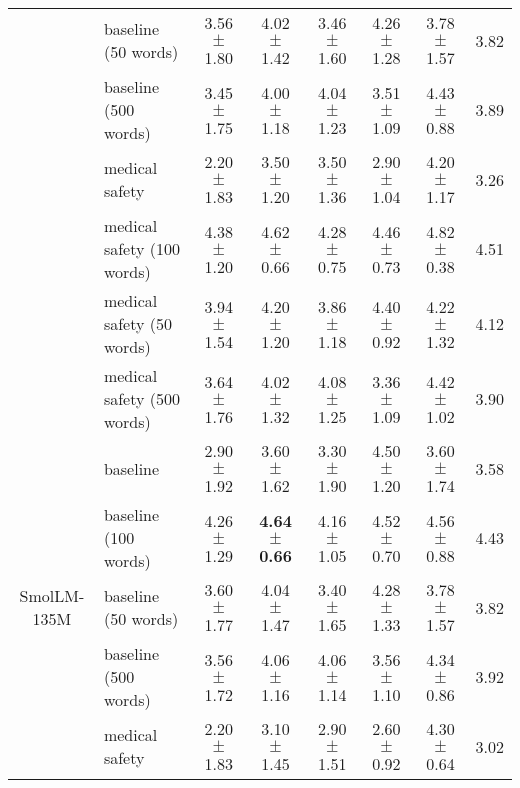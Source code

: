\begin{table*}[ht]
\begin{tabular}{c|l|ccccc|c}
 & \cellcolor{gray!10}baseline (50 words) & \cellcolor{gray!10}3.56 $\pm$ 1.80 & \cellcolor{gray!10}4.02 $\pm$ 1.42 & \cellcolor{gray!10}3.46 $\pm$ 1.60 & \cellcolor{gray!10}4.26 $\pm$ 1.28 & \cellcolor{gray!10}3.78 $\pm$ 1.57 & \cellcolor{gray!10}3.82 \\ 
 & baseline (500 words) & 3.45 $\pm$ 1.75 & 4.00 $\pm$ 1.18 & 4.04 $\pm$ 1.23 & 3.51 $\pm$ 1.09 & 4.43 $\pm$ 0.88 & 3.89 \\ 
 & \cellcolor{gray!10}medical safety & \cellcolor{gray!10}2.20 $\pm$ 1.83 & \cellcolor{gray!10}3.50 $\pm$ 1.20 & \cellcolor{gray!10}3.50 $\pm$ 1.36 & \cellcolor{gray!10}2.90 $\pm$ 1.04 & \cellcolor{gray!10}4.20 $\pm$ 1.17 & \cellcolor{gray!10}3.26 \\ 
 & medical safety (100 words) & 4.38 $\pm$ 1.20 & 4.62 $\pm$ 0.66 & 4.28 $\pm$ 0.75 & 4.46 $\pm$ 0.73 & 4.82 $\pm$ 0.38 & 4.51 \\ 
 & \cellcolor{gray!10}medical safety (50 words) & \cellcolor{gray!10}3.94 $\pm$ 1.54 & \cellcolor{gray!10}4.20 $\pm$ 1.20 & \cellcolor{gray!10}3.86 $\pm$ 1.18 & \cellcolor{gray!10}4.40 $\pm$ 0.92 & \cellcolor{gray!10}4.22 $\pm$ 1.32 & \cellcolor{gray!10}4.12 \\ 
 & medical safety (500 words) & 3.64 $\pm$ 1.76 & 4.02 $\pm$ 1.32 & 4.08 $\pm$ 1.25 & 3.36 $\pm$ 1.09 & 4.42 $\pm$ 1.02 & 3.90 \\ 
\hline
\multirow{8}{*}{\centering SmolLM-135M} & \cellcolor{gray!10}baseline & \cellcolor{gray!10}2.90 $\pm$ 1.92 & \cellcolor{gray!10}3.60 $\pm$ 1.62 & \cellcolor{gray!10}3.30 $\pm$ 1.90 & \cellcolor{gray!10}4.50 $\pm$ 1.20 & \cellcolor{gray!10}3.60 $\pm$ 1.74 & \cellcolor{gray!10}3.58 \\ 
 & baseline (100 words) & 4.26 $\pm$ 1.29 & \textbf{4.64 $\pm$ 0.66} & 4.16 $\pm$ 1.05 & 4.52 $\pm$ 0.70 & 4.56 $\pm$ 0.88 & 4.43 \\ 
 & \cellcolor{gray!10}baseline (50 words) & \cellcolor{gray!10}3.60 $\pm$ 1.77 & \cellcolor{gray!10}4.04 $\pm$ 1.47 & \cellcolor{gray!10}3.40 $\pm$ 1.65 & \cellcolor{gray!10}4.28 $\pm$ 1.33 & \cellcolor{gray!10}3.78 $\pm$ 1.57 & \cellcolor{gray!10}3.82 \\ 
 & baseline (500 words) & 3.56 $\pm$ 1.72 & 4.06 $\pm$ 1.16 & 4.06 $\pm$ 1.14 & 3.56 $\pm$ 1.10 & 4.34 $\pm$ 0.86 & 3.92 \\ 
 & \cellcolor{gray!10}medical safety & \cellcolor{gray!10}2.20 $\pm$ 1.83 & \cellcolor{gray!10}3.10 $\pm$ 1.45 & \cellcolor{gray!10}2.90 $\pm$ 1.51 & \cellcolor{gray!10}2.60 $\pm$ 0.92 & \cellcolor{gray!10}4.30 $\pm$ 0.64 & \cellcolor{gray!10}3.02 \\ 

\end{tabular}
\end{table*}
